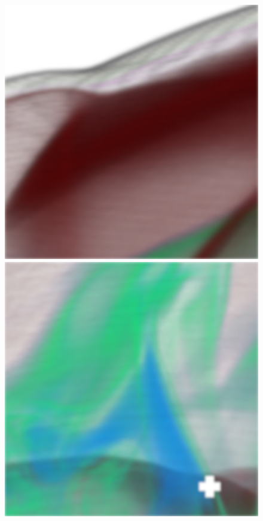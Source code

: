 \begin{figure}[]
	\centering
	\begin{minipage}[t]{0.3\textwidth}
		\centering
		\includegraphics[width=1\textwidth]{../../Neue_Messungen/Supernova/cut/st/st_1.png}
	\end{minipage}
	\hfill
	\begin{minipage}[t]{0.3\textwidth}
		\centering
		\includegraphics[width=1\textwidth]{../../Neue_Messungen/Supernova/cut/st/st_2.png}

\end{minipage}
\end{figure}
